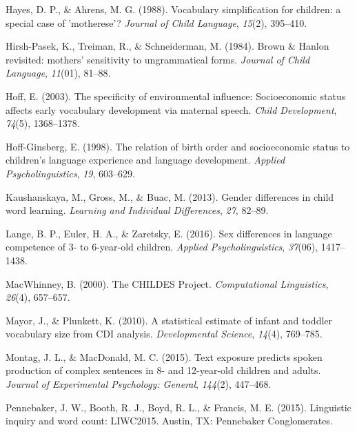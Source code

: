 \documentclass[10pt, letterpaper]{article}
\begin{document}
\leavevmode\hypertarget{ref-Hayes:1988ue}{}%
Hayes, D. P., \& Ahrens, M. G. (1988). Vocabulary simplification for
children: a special case of 'motherese'? \emph{Journal of Child
Language}, \emph{15}(2), 395--410.

\leavevmode\hypertarget{ref-HirshPasek:1984bd}{}%
Hirsh-Pasek, K., Treiman, R., \& Schneiderman, M. (1984). Brown \&
Hanlon revisited: mothers' sensitivity to ungrammatical forms.
\emph{Journal of Child Language}, \emph{11}(01), 81--88.

\leavevmode\hypertarget{ref-Hoff:2003kx}{}%
Hoff, E. (2003). The specificity of environmental influence:
Socioeconomic status affects early vocabulary development via maternal
speech. \emph{Child Development}, \emph{74}(5), 1368--1378.

\leavevmode\hypertarget{ref-HoffGinsberg:2008up}{}%
Hoff-Ginsberg, E. (1998). The relation of birth order and socioeconomic
status to children's language experience and language development.
\emph{Applied Psycholinguistics}, \emph{19}, 603--629.

\leavevmode\hypertarget{ref-Kaushanskaya:2013gi}{}%
Kaushanskaya, M., Gross, M., \& Buac, M. (2013). Gender differences in
child word learning. \emph{Learning and Individual Differences},
\emph{27}, 82--89.

\leavevmode\hypertarget{ref-Lange:2016gv}{}%
Lange, B. P., Euler, H. A., \& Zaretsky, E. (2016). Sex differences in
language competence of 3- to 6-year-old children. \emph{Applied
Psycholinguistics}, \emph{37}(06), 1417--1438.

\leavevmode\hypertarget{ref-MacWhinney:2000jx}{}%
MacWhinney, B. (2000). The CHILDES Project. \emph{Computational
Linguistics}, \emph{26}(4), 657--657.

\leavevmode\hypertarget{ref-Mayor:2010kp}{}%
Mayor, J., \& Plunkett, K. (2010). A statistical estimate of infant and
toddler vocabulary size from CDI analysis. \emph{Developmental Science},
\emph{14}(4), 769--785.

\leavevmode\hypertarget{ref-Montag:2015iy}{}%
Montag, J. L., \& MacDonald, M. C. (2015). Text exposure predicts spoken
production of complex sentences in 8- and 12-year-old children and
adults. \emph{Journal of Experimental Psychology: General},
\emph{144}(2), 447--468.

\leavevmode\hypertarget{ref-Pennebaker:kqtgxul0}{}%
Pennebaker, J. W., Booth, R. J., Boyd, R. L., \& Francis, M. E. (2015).
Linguistic inquiry and word count: LIWC2015. Austin, TX: Pennebaker
Conglomerates.
\end{document}
